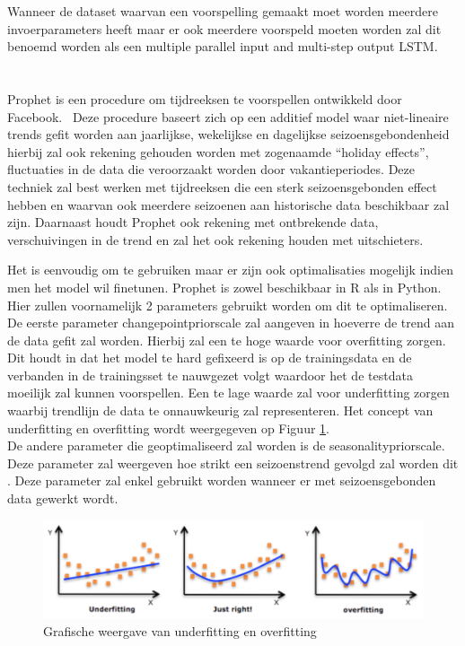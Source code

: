 Wanneer de dataset waarvan een voorspelling gemaakt moet worden meerdere invoerparameters heeft maar er  ook meerdere voorspeld moeten worden zal dit benoemd worden als een multiple parallel input and multi-step output LSTM.

\section{}

Prophet is een procedure om tijdreeksen te voorspellen ontwikkeld door Facebook.~\autocite{Prophet2020} Deze procedure baseert zich op een additief model waar niet-lineaire trends gefit worden aan jaarlijkse, wekelijkse en dagelijkse seizoensgebondenheid hierbij zal ook rekening gehouden worden met zogenaamde ``holiday effects'', fluctuaties in de data die veroorzaakt worden door vakantieperiodes. Deze techniek zal best werken met tijdreeksen die een sterk seizoensgebonden effect hebben en waarvan ook meerdere seizoenen aan historische data beschikbaar zal zijn. Daarnaast houdt Prophet ook rekening met ontbrekende data, verschuivingen in de trend en zal het ook rekening houden met uitschieters. 

Het is eenvoudig om te gebruiken maar er zijn ook optimalisaties mogelijk indien men het model wil finetunen. Prophet is zowel beschikbaar in R als in Python.
\\

Hier zullen voornamelijk 2 parameters gebruikt worden om dit te optimaliseren.
De eerste parameter changepoint\textunderscore prior\textunderscore scale zal aangeven in hoeverre de trend aan de data gefit zal worden. Hierbij zal een te hoge waarde voor overfitting zorgen. Dit houdt in dat het model te hard gefixeerd is op de trainingsdata en de verbanden in de trainingsset te nauwgezet volgt waardoor het de testdata moeilijk zal kunnen voorspellen. Een te lage waarde  zal voor underfitting zorgen waarbij trendlijn de data te onnauwkeurig zal representeren. Het concept van underfitting en overfitting wordt weergegeven op Figuur \ref{fig:fittingcurve}.\\

De andere parameter die geoptimaliseerd zal worden is de seasonality\textunderscore prior\textunderscore scale. Deze parameter zal weergeven hoe strikt een seizoenstrend gevolgd zal worden dit . Deze parameter zal enkel gebruikt worden wanneer er met seizoensgebonden data gewerkt wordt.


\begin{figure}
    \centering
    \caption{Grafische weergave van underfitting en overfitting ~\autocite{Decorte2019}}
    \label{fig:fittingcurve}
    \includegraphics[width=1\linewidth]{fittingcurve}
\end{figure}


